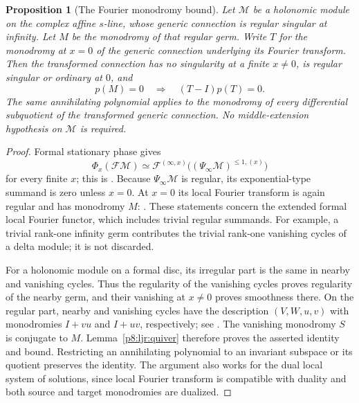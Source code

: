 \documentclass[11pt,a4paper]{article}
\newtheorem{proposition}[theorem]{Proposition}
\theoremstyle{definition}
\theoremstyle{remark}
\numberwithin{equation}{section}
\begin{document}
\begin{proposition}[The Fourier monodromy bound]\label{p8:ljr:fourier}
Let $\mathcal M$ be a holonomic module on the complex affine $s$-line,
whose generic connection is regular singular at infinity. Let $M$ be
the monodromy of that regular germ. Write $T$ for the monodromy at
$x=0$ of the generic connection underlying its Fourier transform.
Then the transformed connection has no singularity at a finite
$x\ne0$, is regular singular or ordinary at $0$, and
\[
                 p(M)=0\quad\Longrightarrow\quad(T-I)p(T)=0.
\]
The same annihilating polynomial applies to the monodromy of every
differential subquotient of the transformed generic connection.
No middle-extension hypothesis on $\mathcal M$ is required.
\end{proposition}
\begin{proof}
Formal stationary phase gives
\[
 \Phi_x(\mathcal F\mathcal M)
  \simeq\mathcal F^{(\infty,x)}
       \bigl((\Psi_\infty\mathcal M)^{\le1,(x)}\bigr)
\]
for every finite $x$; this is \cite[Corollary~2.3(1)]{p8:LJR_Arinkin}.
Because $\Psi_\infty\mathcal M$ is regular, its exponential-type
summand is zero unless $x=0$.  At $x=0$ its local Fourier transform
is again regular and has monodromy $M$:
\cite[Remark~5.2 and Remark~5.3(4)]{p5:BG_Sabbah2008}.
These statements concern the extended formal local Fourier functor,
which includes trivial regular summands. For example, a trivial
rank-one infinity germ contributes the trivial rank-one vanishing
cycles of a delta module; it is not discarded.

For a holonomic module on a formal disc, its irregular part is the
same in nearby and vanishing cycles. Thus the regularity of the
vanishing cycles proves regularity of the nearby germ, and their
vanishing at $x\ne0$ proves smoothness there.  On the regular part,
nearby and vanishing cycles have the description
$(V,W,u,v)$ with monodromies $I+vu$ and $I+uv$, respectively;
see \cite[\S3.3, formula~(3.3)]{p8:LJR_Arinkin}.  The vanishing
monodromy $S$ is conjugate to $M$. Lemma~\ref{p8:ljr:quiver}
therefore proves the asserted identity and bound. Restricting an
annihilating polynomial to an invariant subspace or its quotient
preserves the identity. The argument also works for the dual local
system of solutions, since local Fourier transform is compatible
with duality and both source and target monodromies are dualized.
\end{proof}
\end{document}
